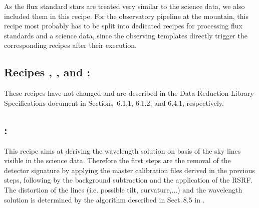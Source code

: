 As the flux standard stars are treated very similar to the science
data, we also included them in this recipe. For the observatory
pipeline at the mountain, this recipe most probably has to be split
into dedicated recipes for processing flux standards and a science
data, since the observing templates directly trigger the corresponding
recipes after their execution.

\subsection{Recipes , , and :}
These recipes have not changed and are described in the Data Reduction Library Specifications document \cite{DRLS} in Sections~6.1.1, 6.1.2, and 6.4.1, respectively.

\subsection{:}
This recipe aims at deriving the wavelength solution on basis of the sky lines visible in the science data. Therefore the first steps are the removal of the detector signature by applying the master calibration files derived in the previous steps, following by the background subtraction and the application of the RSRF. The distortion of the lines (i.e. possible tilt, curvature,...) and the wavelength solution is determined by the algorithm described in Sect.\,8.5 in \cite{DRLS}.

